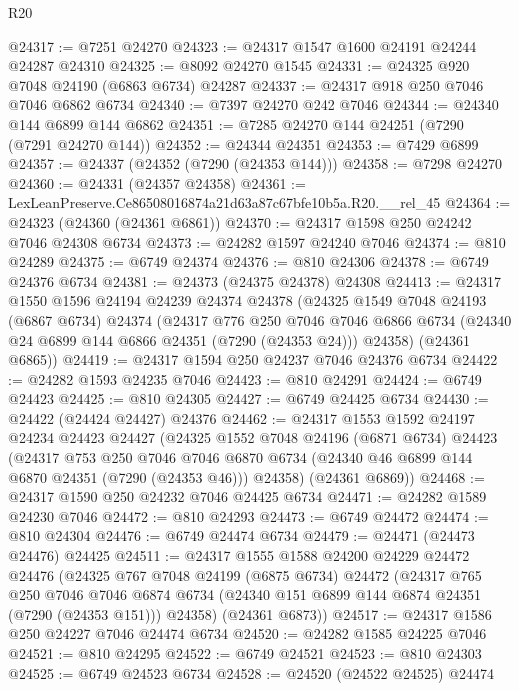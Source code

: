 \begin{lexlean}{R20}
\begin{coremodule}
{@24317 := @7251 @24270
@24323 := @24317 @1547 @1600 @24191 @24244 @24287 @24310
@24325 := @8092 @24270 @1545
@24331 := @24325 @920 @7048 @24190 (@6863 @6734) @24287
@24337 := @24317 @918 @250 @7046 @7046 @6862 @6734
@24340 := @7397 @24270 @242 @7046
@24344 := @24340 @144 @6899 @144 @6862
@24351 := @7285 @24270 @144 @24251 (@7290 (@7291 @24270 @144))
@24352 := @24344 @24351
@24353 := @7429 @6899
@24357 := @24337 (@24352 (@7290 (@24353 @144)))
@24358 := @7298 @24270
@24360 := @24331 (@24357 @24358)
@24361 := LexLeanPreserve.Ce86508016874a21d63a87c67bfe10b5a.R20.__rel_45
@24364 := @24323 (@24360 (@24361 @6861))
@24370 := @24317 @1598 @250 @24242 @7046 @24308 @6734
@24373 := @24282 @1597 @24240 @7046
@24374 := @810 @24289
@24375 := @6749 @24374
@24376 := @810 @24306
@24378 := @6749 @24376 @6734
@24381 := @24373 (@24375 @24378) @24308
@24413 := @24317
    @1550
    @1596
    @24194
    @24239
    @24374
    @24378
    (@24325
      @1549
      @7048
      @24193
      (@6867 @6734)
      @24374
      (@24317
        @776
        @250
        @7046
        @7046
        @6866
        @6734
        (@24340 @24 @6899 @144 @6866 @24351 (@7290 (@24353 @24)))
        @24358)
      (@24361 @6865))
@24419 := @24317 @1594 @250 @24237 @7046 @24376 @6734
@24422 := @24282 @1593 @24235 @7046
@24423 := @810 @24291
@24424 := @6749 @24423
@24425 := @810 @24305
@24427 := @6749 @24425 @6734
@24430 := @24422 (@24424 @24427) @24376
@24462 := @24317
    @1553
    @1592
    @24197
    @24234
    @24423
    @24427
    (@24325
      @1552
      @7048
      @24196
      (@6871 @6734)
      @24423
      (@24317
        @753
        @250
        @7046
        @7046
        @6870
        @6734
        (@24340 @46 @6899 @144 @6870 @24351 (@7290 (@24353 @46)))
        @24358)
      (@24361 @6869))
@24468 := @24317 @1590 @250 @24232 @7046 @24425 @6734
@24471 := @24282 @1589 @24230 @7046
@24472 := @810 @24293
@24473 := @6749 @24472
@24474 := @810 @24304
@24476 := @6749 @24474 @6734
@24479 := @24471 (@24473 @24476) @24425
@24511 := @24317
    @1555
    @1588
    @24200
    @24229
    @24472
    @24476
    (@24325
      @767
      @7048
      @24199
      (@6875 @6734)
      @24472
      (@24317
        @765
        @250
        @7046
        @7046
        @6874
        @6734
        (@24340 @151 @6899 @144 @6874 @24351 (@7290 (@24353 @151)))
        @24358)
      (@24361 @6873))
@24517 := @24317 @1586 @250 @24227 @7046 @24474 @6734
@24520 := @24282 @1585 @24225 @7046
@24521 := @810 @24295
@24522 := @6749 @24521
@24523 := @810 @24303
@24525 := @6749 @24523 @6734
@24528 := @24520 (@24522 @24525) @24474
}
\end{coremodule}
\end{lexlean}
